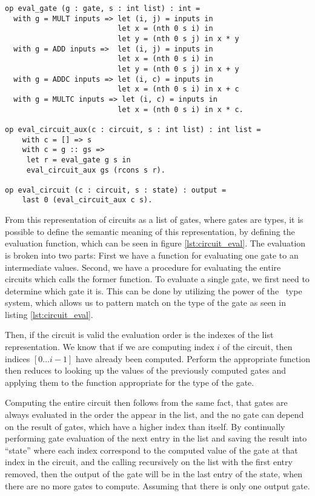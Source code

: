 \begin{lstlisting}[float,label=lst:circuit_eval,caption=Circuit evaluation function]
op eval_gate (g : gate, s : int list) : int =
  with g = MULT inputs => let (i, j) = inputs in
                          let x = (nth 0 s i) in
                          let y = (nth 0 s j) in x * y
  with g = ADD inputs =>  let (i, j) = inputs in
                          let x = (nth 0 s i) in
                          let y = (nth 0 s j) in x + y
  with g = ADDC inputs => let (i, c) = inputs in
                          let x = (nth 0 s i) in x + c
  with g = MULTC inputs => let (i, c) = inputs in
                          let x = (nth 0 s i) in x * c.

op eval_circuit_aux(c : circuit, s : int list) : int list =
    with c = [] => s
    with c = g :: gs =>
     let r = eval_gate g s in
     eval_circuit_aux gs (rcons s r).

op eval_circuit (c : circuit, s : state) : output =
    last 0 (eval_circuit_aux c s).
\end{lstlisting}

From this representation of circuits as a list of gates, where gates are types,
it is possible to define the semantic meaning of this representation, by
defining the evaluation function, which can be seen in figure \ref{lst:circuit_eval}.
The evaluation is broken into two parts: First we have a function for evaluating
one gate to an intermediate values. Second, we have a procedure for evaluating
the entire circuits which calls the former function.
To evaluate a single gate, we first need to determine which gate it is. This can
be done by utilizing the power of the \easycrypt\ type system, which allows us
to pattern match on the type of the gate as seen in listing \ref{lst:circuit_eval}.

Then, if the circuit is valid the evaluation order is the indexes of the list representation.
We know that if we are computing index $i$ of the circuit, then indices
$[0 \dots i-1]$ have already been computed. Perform the appropriate function
then reduces to looking up the values of the previously computed gates and
applying them to the function appropriate for the type of the gate.

Computing the entire circuit then follows from the same fact, that gates are always
evaluated in the order the appear in the list, and the no gate can depend on
the result of gates, which have a higher index than itself. By continually
performing gate evaluation of the next entry in the list and saving the result
into ``state'' where each index correspond to the computed value of the gate at
that index in the circuit, and the calling recursively on the list with the
first entry removed, then the output of the gate will be in the last entry of
the state, when there are no more gates to compute. Assuming that there is only
one output gate.

